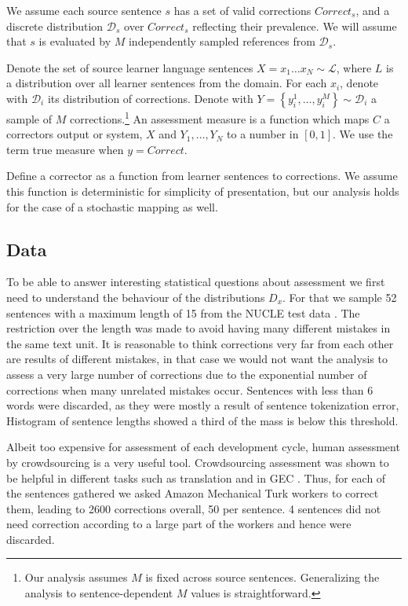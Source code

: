 \documentclass[letter,11pt]{article}
\begin{document}
		We assume each source sentence $s$ has a set of valid corrections $Correct_s$,
		and a discrete distribution $\mathcal{D}_s$ over $Correct_s$ reflecting their prevalence.
		We will assume that $s$ is evaluated by
		$M$ independently sampled references from $\mathcal{D}_s$.
		
		Denote the set of source learner language sentences $X=x_{1}\ldots x_N \sim \mathcal{L}$, where
		$L$ is a distribution over all learner sentences from the domain. For each $x_i$, denote
		with $\mathcal{D}_{i}$ its distribution of corrections.
		Denote with $Y = \left\{y_{i}^{1},\ldots, y_{i}^{M}\right\} \sim \mathcal{D}_{i}$
		a sample of $M$ corrections.\footnote{Our analysis assumes $M$ is fixed across source sentences.
			Generalizing the analysis to sentence-dependent $M$ values is straightforward.}
		An assessment measure is a function which maps $C$ a correctors output or system, $X$ and $Y_1,\ldots,Y_N$ to
		a number in $[0,1]$. We use the term true measure when $y=Correct$.
		
		Define a corrector as a function from learner sentences to corrections.
		We assume this function is deterministic for simplicity of presentation,
		but our analysis holds for the case of a stochastic mapping as well.
		
		
		\subsection{Data}
		
		To be able to answer interesting statistical questions about assessment we first
		need to understand the behaviour of the distributions $D_x$. For that we sample
		52 sentences with a maximum length of 15 from the NUCLE test data
		. The restriction over the length was made to avoid having many different mistakes in the same text unit. It is reasonable to think corrections very far from each other are results of different mistakes, in that case we would not want the analysis to assess a very large number of corrections due to the exponential number of corrections when many unrelated mistakes occur.
		Sentences with less than 6 words were discarded, as they were mostly a result of sentence tokenization error,
		Histogram of sentence lengths showed a third of the mass is below this threshold.
		
		Albeit too expensive for assessment of each development cycle, human assessment
		by crowdsourcing is a very useful tool. Crowdsourcing assessment was shown to
		be helpful in different tasks such as translation
		\cite{zaidan2011crowdsourcing,post2012constructing}
		and in GEC \cite{madnani2011they}. %
		Thus, for each of the sentences gathered we asked Amazon Mechanical Turk workers to correct them, leading to 2600 corrections overall,
		50 per sentence. 4 sentences did not need correction according to a large part of the workers and hence were discarded.
		
\end{document}
